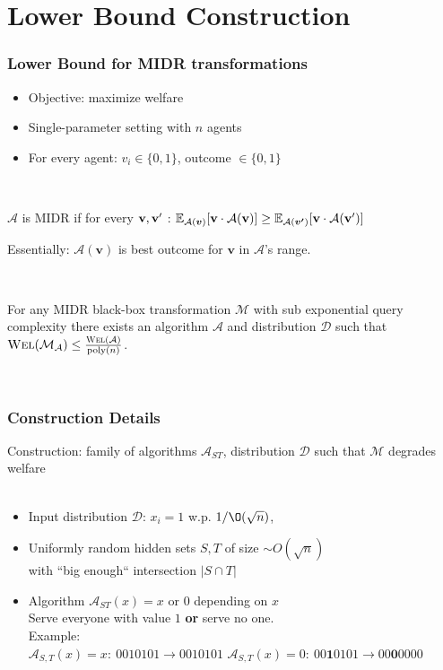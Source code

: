 \documentclass[hyperref={pdfpagelabels=false}]{beamer}
\renewcommand{\v}{\text{\textbf{v}}}
\newcommand{\xmark}{\ding{55}} %
\newcommand{\E}{\mathbb{E}}
\newcommand{\Wel}{\textsc{Wel}}
\newcommand\Dist{\mathcal{D}}
\newcommand\Algo{\mathcal{A}}
\newcommand\Mech{\mathcal{M}}
\begin{document}
\section{Lower Bound Construction }
\begin{frame}
	\frametitle{Lower Bound for MIDR transformations}
	\begin{itemize}
		\item Objective: maximize welfare
		\item Single-parameter setting with $n$ agents
		\item For every agent: $v_i \in \{0,1\}$, outcome $\in \{0,1\}$
	\end{itemize}
	\mbox{} \\ 
	\begin{definition}[MIDR]
 $\Algo$ is MIDR if for every $\v,\v'$ :
  $
  \E_{\Algo(\bm{v})}[ \v \cdot \Algo(\v)] \ge \E_{\Algo(\bm{v'})} [\v \cdot \Algo(\v')]
   $ 
   \end{definition}
   Essentially: $\Algo(\bm{v})$ is best outcome for $\bm{v}$ in $\Algo$'s range.
	\pause
	
	\mbox{}\\
  
	\setcounter{theorem}{0}
		\begin{theorem}\label{thm:MIDR_formal}
	 For any MIDR black-box transformation $\Mech$ with sub exponential query complexity
	  there exists an algorithm $\Algo$ and
	  distribution $\Dist$ such that $\Wel(\Mech_{\Algo}) \le \frac{ \Wel(\Algo) }{\text{poly}(n)}$. 
	\end{theorem}
	
	\mbox{}\\


\end{frame}

\begin{frame}
	\frametitle{Construction Details}
	
	Construction:  family of algorithms $\Algo_{ST}$, distribution $\Dist$ such
	that $\Mech$ degrades welfare\\
	\mbox{}\\
	\begin{itemize}
	\setlength\itemsep{1em}
		\item Input distribution $\Dist$: $x_i=1$ w.p. $1/\O(\sqrt{n})$,
		\item Uniformly random hidden sets $S,T$ of size $\sim O(\sqrt{n})$\\
				with ``big enough`` intersection $|S\cap T|$
		\item Algorithm $\Algo_{ST}(x) = x \text{ or } 0$ depending on $x$\\
				Serve everyone with value $1$ \textbf{or} serve no one.\\
				Example:\\

				$\Algo_{S,T}(x) = x:\ 0010101 \rightarrow 0010101$ \textcolor{green}{\checkmark}
				$\Algo_{S,T}(x) = 0:\ 00\bm{1}0101 \rightarrow 00\bm{0}0000$ \textcolor{red}{\xmark}

	\end{itemize}
\end{frame}
\end{document}
